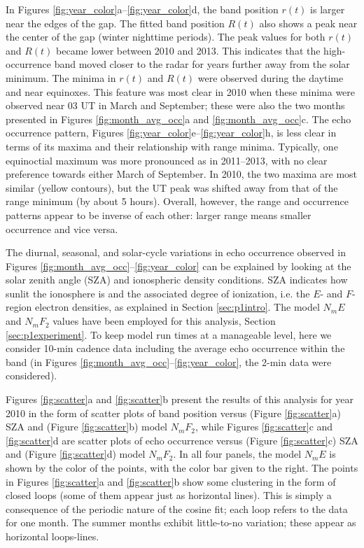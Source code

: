 In Figures \ref{fig:year_color}a--\ref{fig:year_color}d, the band position \(r\left(t\right)\) is larger near the edges of the gap.  The fitted band position \(R(t)\) also shows a peak near the center of the gap (winter nighttime periods).  The peak values for both \(r(t)\) and \(R(t)\) became lower between 2010 and 2013.  This indicates that the high-occurrence band moved closer to the radar for years further away from the solar minimum.  The minima in \(r(t)\) and \(R\left(t\right)\) were observed during the daytime and near equinoxes. This feature was most clear in 2010 when these minima were observed near 03 UT in March and September; these were also the two months presented in Figures \ref{fig:month_avg_occ}a and \ref{fig:month_avg_occ}c. The echo occurrence pattern, Figures \ref{fig:year_color}e--\ref{fig:year_color}h, is less clear in terms of its maxima and their relationship with range minima. Typically, one equinoctial maximum was more pronounced as in 2011--2013, with no clear preference towards either March of September. In 2010, the two maxima are most similar (yellow contours), but the UT peak was shifted away from that of the range minimum (by about 5 hours). Overall, however, the range and occurrence patterns appear to be inverse of each other: larger range means smaller occurrence and vice versa.

The diurnal, seasonal, and solar-cycle variations in echo occurrence observed in Figures \ref{fig:month_avg_occ}--\ref{fig:year_color} can be explained by looking at the solar zenith angle (SZA) and ionospheric density conditions. SZA indicates how sunlit the ionosphere is and the associated degree of ionization, i.e. the \(E\)- and \(F\)-region electron densities, as explained in Section \ref{sec:p1intro}. The model \(N_mE\) and \(N_mF_2\) values have been employed for this analysis, Section \ref{sec:p1experiment}. To keep model run times at a manageable level, here we consider 10-min cadence data including the average echo occurrence within the band (in Figures \ref{fig:month_avg_occ}--\ref{fig:year_color}, the 2-min data were considered).



Figures \ref{fig:scatter}a and \ref{fig:scatter}b present the results of this analysis for year 2010 in the form of scatter plots of band position versus (Figure \ref{fig:scatter}a) SZA and (Figure \ref{fig:scatter}b) model \(N_mF_2\), while Figures \ref{fig:scatter}c and \ref{fig:scatter}d are scatter plots of echo occurrence versus (Figure \ref{fig:scatter}c) SZA and (Figure \ref{fig:scatter}d) model \(N_mF_2\). In all four panels, the model \(N_mE\) is shown by the color of the points, with the color bar given to the right. The points in Figures \ref{fig:scatter}a and \ref{fig:scatter}b show some clustering in the form of closed loops (some of them appear just as horizontal lines). This is simply a consequence of the periodic nature of the cosine fit; each loop refers to the data for one month. The summer months exhibit little-to-no variation; these appear as horizontal loops-lines.

